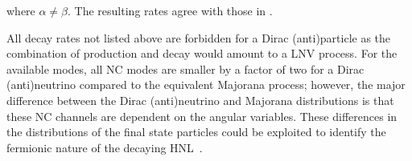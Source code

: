 where $\alpha \neq \beta$.
The resulting rates agree with those in .  
%
%

All decay rates not listed above are forbidden for a Dirac (anti)particle as the combination of production %
and decay would amount to a LNV process.
% 
For the available modes, all NC modes are smaller by a factor of two for a Dirac (anti)neutrino compared %
to the equivalent Majorana process; however, the major difference between the Dirac (anti)neutrino and Majorana distributions %
is that these NC channels are dependent on the angular variables.
These differences in the distributions of the final state particles could be exploited to identify %
the fermionic nature of the decaying HNL~\cite{Balantekin:2018ukw}.





